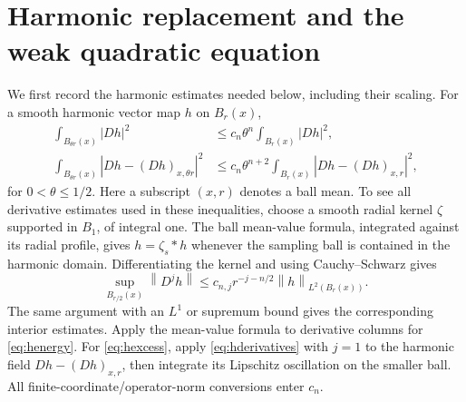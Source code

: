 \documentclass[11pt,a4paper]{article}
\numberwithin{equation}{section}
\theoremstyle{definition}
\theoremstyle{remark}
\newcommand{\norm}[1]{\left\lVert#1\right\rVert}
\begin{document}
\section{Harmonic replacement and the weak quadratic equation}
\label{sec:comparison}

We first record the harmonic estimates needed below, including their scaling.
For a smooth harmonic vector map \(h\) on \(B_r(x)\),
\begin{align}
 \int_{B_{\theta r}(x)}|Dh|^2
 &\le c_n\theta^n\int_{B_r(x)}|Dh|^2,
 \label{eq:henergy}\\
 \int_{B_{\theta r}(x)}|Dh-(Dh)_{x,\theta r}|^2
 &\le c_n\theta^{n+2}\int_{B_r(x)}|Dh-(Dh)_{x,r}|^2,
 \label{eq:hexcess}
\end{align}
for \(0<\theta\le1/2\). Here a subscript \((x,r)\) denotes a ball mean.
To see all derivative estimates used in these inequalities, choose a smooth
radial kernel \(\zeta\) supported in \(B_1\), of integral one. The ball
mean-value formula, integrated against its radial profile, gives
\(h=\zeta_s*h\) whenever the sampling ball is contained in the harmonic
domain. Differentiating the kernel and using Cauchy--Schwarz gives
\begin{equation}\label{eq:hderivatives}
 \sup_{B_{r/2}(x)}\norm{D^jh}
 \le c_{n,j}r^{-j-n/2}\norm{h}_{L^2(B_r(x))}.
\end{equation}
The same argument with an \(L^1\) or supremum bound gives the corresponding
interior estimates. Apply the mean-value formula to derivative columns for
\eqref{eq:henergy}. For \eqref{eq:hexcess}, apply
\eqref{eq:hderivatives} with \(j=1\) to the harmonic field
\(Dh-(Dh)_{x,r}\), then integrate its Lipschitz oscillation on the smaller
ball. All finite-coordinate/operator-norm conversions enter \(c_n\).
\end{document}
